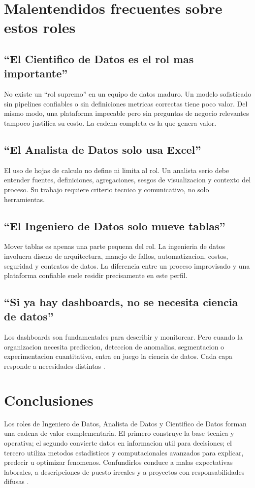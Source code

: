 \documentclass[12pt]{article}
\begin{document}
\section{Malentendidos frecuentes sobre estos roles}
\subsection{``El Cientifico de Datos es el rol mas importante''}
No existe un ``rol supremo'' en un equipo de datos maduro. Un modelo sofisticado sin pipelines confiables o sin definiciones metricas correctas tiene poco valor. Del mismo modo, una plataforma impecable pero sin preguntas de negocio relevantes tampoco justifica su costo. La cadena completa es la que genera valor.

\subsection{``El Analista de Datos solo usa Excel''}
El uso de hojas de calculo no define ni limita al rol. Un analista serio debe entender fuentes, definiciones, agregaciones, sesgos de visualizacion y contexto del proceso. Su trabajo requiere criterio tecnico y comunicativo, no solo herramientas.

\subsection{``El Ingeniero de Datos solo mueve tablas''}
Mover tablas es apenas una parte pequena del rol. La ingenieria de datos involucra diseno de arquitectura, manejo de fallos, automatizacion, costos, seguridad y contratos de datos. La diferencia entre un proceso improvisado y una plataforma confiable suele residir precisamente en este perfil.

\subsection{``Si ya hay dashboards, no se necesita ciencia de datos''}
Los dashboards son fundamentales para describir y monitorear. Pero cuando la organizacion necesita prediccion, deteccion de anomalias, segmentacion o experimentacion cuantitativa, entra en juego la ciencia de datos. Cada capa responde a necesidades distintas \cite{aws_analytics,aws_data_science}.

\section{Conclusiones}
Los roles de Ingeniero de Datos, Analista de Datos y Cientifico de Datos forman una cadena de valor complementaria. El primero construye la base tecnica y operativa; el segundo convierte datos en informacion util para decisiones; el tercero utiliza metodos estadisticos y computacionales avanzados para explicar, predecir u optimizar fenomenos. Confundirlos conduce a malas expectativas laborales, a descripciones de puesto irreales y a proyectos con responsabilidades difusas \cite{ibm_roles,ibm_modern_team}.
\end{document}
